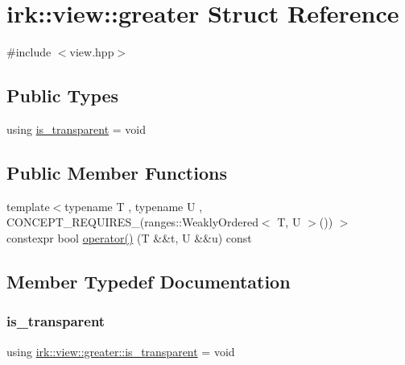 \hypertarget{structirk_1_1view_1_1greater}{}\section{irk\+:\+:view\+:\+:greater Struct Reference}
\label{structirk_1_1view_1_1greater}


{\ttfamily \#include $<$view.\+hpp$>$}

\subsection*{Public Types}
\begin{DoxyCompactItemize}
\item 
using \mbox{\hyperlink{structirk_1_1view_1_1greater_acd1421c947541114e2a259bb2ee06e6b}{is\+\_\+transparent}} = void
\end{DoxyCompactItemize}
\subsection*{Public Member Functions}
\begin{DoxyCompactItemize}
\item 
{\footnotesize template$<$typename T , typename U , C\+O\+N\+C\+E\+P\+T\+\_\+\+R\+E\+Q\+U\+I\+R\+E\+S\+\_\+(ranges\+::\+Weakly\+Ordered$<$ T, U $>$()) $>$ }\\constexpr bool \mbox{\hyperlink{structirk_1_1view_1_1greater_aa40b3ea5907d02b3e70401c9b076284c}{operator()}} (T \&\&t, U \&\&u) const
\end{DoxyCompactItemize}


\subsection{Member Typedef Documentation}
\mbox{\label{structirk_1_1view_1_1greater_acd1421c947541114e2a259bb2ee06e6b}} 
\subsubsection{\texorpdfstring{is\+\_\+transparent}{is\_transparent}}
{\footnotesize\ttfamily using \mbox{\hyperlink{structirk_1_1view_1_1greater_acd1421c947541114e2a259bb2ee06e6b}{irk\+::view\+::greater\+::is\+\_\+transparent}} =  void}




